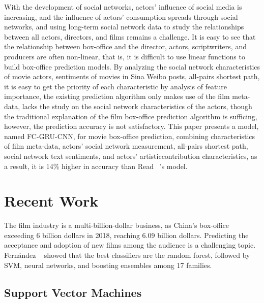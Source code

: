 \documentclass[review]{cvpr}
\begin{document}
  With the development of social networks, actors' influence of social media is increasing, and the influence of actors' consumption spreads through social networks,
  and using long-term social network data to study the relationships between all actors, directors, and films remains a challenge.
  It is easy to see that the relationship between box-office and the director, actors, scriptwriters, and producers are often non-linear, that is,
  it is difficult to use linear functions to build box-office prediction models.
  By analyzing the social network characteristics of movie actors, sentiments of movies in Sina Weibo posts, all-pairs shortest path,
  it is easy to get the priority of each characteristic by analysis of feature importance,
  the existing prediction algorithm only makes use of the film meta-data, lacks the study on the social network characteristics of the actors,
  though the traditional explanation of the film box-office prediction algorithm is sufficing, however, the prediction accuracy is not satisfactory.
  This paper presents a model, named FC-GRU-CNN, for movie box-office prediction, combining characteristics of film meta-data, actors' social network measurement,
  all-pairs shortest path, social network text sentiments, and actors' artisticcontribution characteristics,
  as a result, it is 14\% higher in accuracy than Read \etal ~\cite{read2016learning}'s model.


\section{Recent Work}

  The film industry is a multi-billion-dollar business, as China's box-office exceeding 6 billion dollars in 2018, reaching 6.09 billion dollars.
  Predicting the acceptance and adoption of new films among the audience is a challenging topic.
  Fern{\'a}ndez \etal ~\cite{fernandez2014we} showed that the best classifiers are the random forest,
  followed by SVM, neural networks, and boosting ensembles among 17 families.


\subsection{Support Vector Machines}
\end{document}
